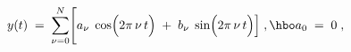 \begin{equation}
y(t) \; = \; \sum _{\nu = 0 }^N \Biggl[ a_\nu \; \cos \Bigl( 
2\pi \, \nu \, t \Bigr) \; + \; b_\nu \; \sin \Bigl( 
2\pi \, \nu \, t \Bigr) \Bigr] \; , \hbo a_0 \; = \; 0 \; , 
\label{fo1}
\end{equation}

